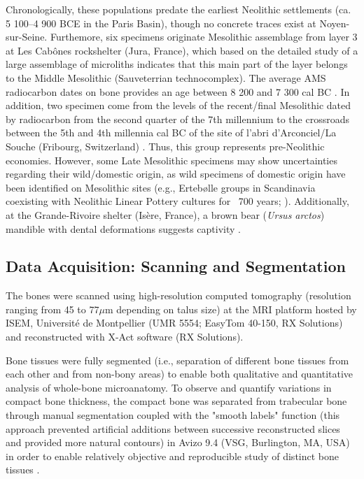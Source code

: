 \documentclass[12pt,a4paper]{article}
\begin{document}
Chronologically, these populations predate the earliest Neolithic settlements (ca. 5 100–4 900 BCE in the Paris Basin), though no concrete traces exist at Noyen-sur-Seine. Furthemore, six specimens originate Mesolithic assemblage from layer 3 at Les Cabônes rockshelter (Jura, France), which based on the detailed study of a large assemblage of microliths indicates that this main part of the layer belongs to the Middle Mesolithic (Sauveterrian technocomplex). The average AMS radiocarbon dates on bone provides an age between 8 200 and 7 300 cal BC \cite{campyRanchotAbriCabones2019,leduc2015wild}. In addition, two specimen come from the levels of the recent/final Mesolithic dated by radiocarbon from the second quarter of the 7th millennium to the crossroads between the 5th and 4th millennia cal BC of the site of l'abri d'Arconciel/La Souche (Fribourg, Switzerland) \cite{bassin2014fin,mauvilly2008abri,mauvilly2007vie}. Thus, this group represents pre-Neolithic economies. However, some Late Mesolithic specimens may show uncertainties regarding their wild/domestic origin, as wild specimens of domestic origin have been identified on Mesolithic sites (e.g., Ertebølle groups in Scandinavia coexisting with Neolithic Linear Pottery cultures for ~700 years; \cite{krause-kyoraUseDomesticatedPigs2013, evinExploringComplexityDomestication2014,rowley-conwyMesolithicDomesticPigs2014,rowley-conwyWildBoarDomestic2014}). Additionally, at the Grande-Rivoire shelter (Isère, France), a brown bear (\textit{Ursus arctos}) mandible with dental deformations suggests captivity \cite{chaixTamedBrownBear1997}. %

\subsection{Data Acquisition: Scanning and Segmentation}
The bones were scanned using high-resolution computed tomography (resolution ranging from 45 to 77$\mu$m depending on talus size) at the MRI platform hosted by ISEM, Université de Montpellier (UMR 5554; EasyTom 40-150, RX Solutions) and reconstructed with X-Act software (RX Solutions). 

Bone tissues were fully segmented (i.e., separation of different bone tissues from each other and from non-bony areas) to enable both qualitative and quantitative analysis of whole-bone microanatomy. To observe and quantify variations in compact bone thickness, the compact bone was separated from trabecular bone through manual segmentation coupled with the "smooth labels" function (this approach prevented artificial additions between successive reconstructed slices and provided more natural contours) in Avizo 9.4 (VSG, Burlington, MA, USA) in order to enable relatively objective and reproducible study of distinct bone tissues \cite{houssayeSesamoidBonesAlso2022w}.
\end{document}
